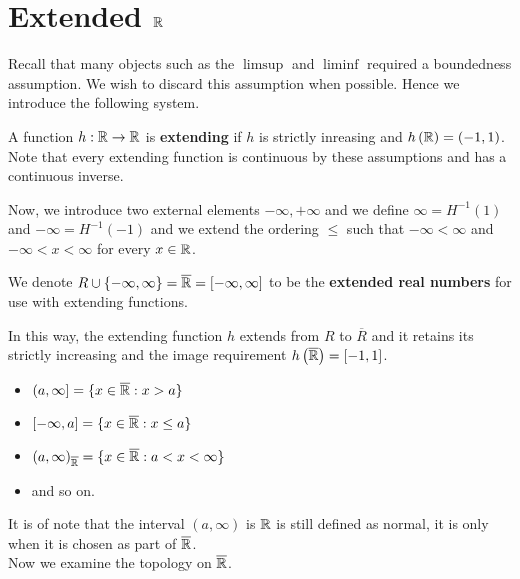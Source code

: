 \section{Extended \(\mathbb{R}\)}
Recall that many objects such as the \(\limsup\) and \(\liminf\) required a boundedness assumption. We wish to discard this assumption when possible. Hence we introduce the following system.
\begin{definition}
	A function \(h: \mathbb{R} \to \mathbb{R}\) is \textbf{extending} if \(h\) is strictly inreasing and \(h\left( \mathbb{R} \right) = \left( -1, 1 \right) \). Note that every extending function is continuous by these assumptions and has a continuous inverse.
\end{definition}
Now, we introduce two external elements \(-\infty,  + \infty\) and we define \(\infty = H^{-1} \left( 1 \right) \) and \(-\infty = H^{-1} \left( -1 \right) \) and we extend the ordering \(\le\) such that \(-\infty < \infty\) and \(-\infty < x < \infty\) for every \(x \in \mathbb{R}\).
\begin{definition}
	We denote \(R \cup \{-\infty ,\infty\}  = \overline{\mathbb{R}} = \left[ -\infty,\infty \right] \) to be the \textbf{extended real numbers} for use with extending functions.
\end{definition}
In this way, the extending function \(h\) extends from \(R\) to \(\overline{R}\) and it retains its strictly increasing and the image requirement \(h\left( \overline{\mathbb{R}} \right) = \left[ -1, 1 \right] \).\\
\begin{notation}
	\begin{itemize}
		\item \(\left( a, \infty \right] = \{x \in \overline{\mathbb{R}} : x > a\}  \)
			\item \(\left[ -\infty, a \right]  = \{x \in \overline{\mathbb{R}} : x \le a\} \)
			\item \(\left( a, \infty \right)_{\overline{\mathbb{R}}} = \{x \in \overline{\mathbb{R}} : a < x < \infty\} \)
				\item and so on.
	\end{itemize}
\end{notation}
It is of note that the interval \(\left( a, \infty \right) \) is \(\mathbb{R}\) is still defined as normal, it is only when it is chosen as part of \(\overline{\mathbb{R}}\).\\
Now we examine the topology on \(\overline{\mathbb{R}}\).
